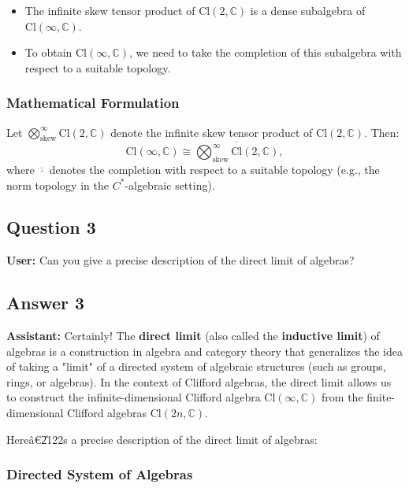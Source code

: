 \documentclass{article}
\begin{document}
\begin{itemize}
\item The infinite skew tensor product of $\text{Cl}(2, \mathbb{C})$ is a
dense subalgebra of $\text{Cl}(\infty, \mathbb{C})$. 

\item To obtain $\text{Cl}(\infty, \mathbb{C})$, we need to take the
completion of this subalgebra with respect to a suitable topology.
\end{itemize}

\subsubsection{Mathematical Formulation}

Let $\bigotimes_{\text{skew}}^\infty \text{Cl}(2, \mathbb{C})$ denote the
infinite skew tensor product of $\text{Cl}(2, \mathbb{C})$. Then: 
\begin{equation*}
\text{Cl}(\infty, \mathbb{C}) \cong \overline{\bigotimes_{\text{skew}%
}^\infty \text{Cl}(2, \mathbb{C})}, 
\end{equation*}
where $\overline{\cdot}$ denotes the completion with respect to a suitable
topology (e.g., the norm topology in the $C^*$-algebraic setting).

\subsection{Question 3}

\textbf{User:} Can you give a precise description of the direct limit of
algebras?

\subsection{Answer 3}

\textbf{Assistant:} Certainly! The \textbf{direct limit} (also called the 
\textbf{inductive limit}) of algebras is a construction in algebra and
category theory that generalizes the idea of taking a "limit" of a directed
system of algebraic structures (such as groups, rings, or algebras). In the
context of Clifford algebras, the direct limit allows us to construct the
infinite-dimensional Clifford algebra $\text{Cl}(\infty, \mathbb{C})$ from
the finite-dimensional Clifford algebras $\text{Cl}(2n, \mathbb{C})$.

Here\^{a}\euro \U{2122}s a precise description of the direct limit of
algebras:

\subsubsection{Directed System of Algebras}
\end{document}
